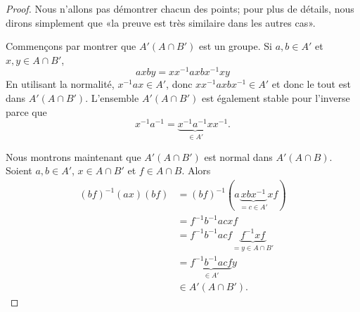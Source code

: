 \begin{proof}
    Nous n'allons pas démontrer chacun des points; pour plus de détails, nous dirons simplement que «la preuve est très similaire dans les autres cas».

    Commençons par montrer que \( A'(A\cap B')\) est un groupe. Si \( a,b\in A'\) et \( x,y\in A\cap B'\),
    \begin{equation}
        axby=xx^{-1}axbx^{-1}xy
    \end{equation}
    En utilisant la normalité, \( x^{-1}ax\in A'\), donc \( xx^{-1}axbx^{-1}\in A'\) et donc le tout est dans \( A'(A\cap B')\). L'ensemble \( A'(A\cap B')\) est également stable pour l'inverse parce que
    \begin{equation}
        x^{-1}a^{-1}=\underbrace{x^{-1}a^{-1}x}_{\in A'}x^{-1}.
    \end{equation}

    Nous montrons maintenant que \( A'(A\cap B')\) est normal dans \( A'(A\cap B)\). Soient \( a,b\in A'\), \( x\in A\cap B'\) et \( f\in A\cap B\). Alors
    \begin{subequations}
        \begin{align}
        (bf)^{-1}(ax)(bf)&=(bf)^{-1}(a\underbrace{xbx^{-1}}_{=c\in A'}xf)\\
        &=f^{-1}b^{-1}acxf\\
        &=f^{-1}b^{-1}acf\underbrace{f^{-1}xf}_{=y\in A\cap B'}\\
        &=\underbrace{f^{-1}b^{-1}acf}_{\in A'}y\\
        &\in A'(A\cap B').
        \end{align}
    \end{subequations}


\end{proof}
